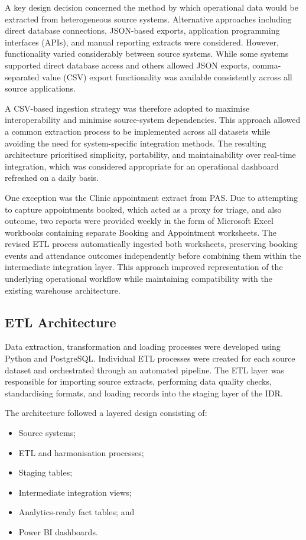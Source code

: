 A key design decision concerned the method by which operational data would be extracted from heterogeneous source systems. Alternative approaches including direct database connections, JSON-based exports, application programming interfaces (APIs), and manual reporting extracts were considered. However, functionality varied considerably between source systems. While some systems supported direct database access and others allowed JSON exports, comma-separated value (CSV) export functionality was available consistently across all source applications.

A CSV-based ingestion strategy was therefore adopted to maximise interoperability and minimise source-system dependencies. This approach allowed a common extraction process to be implemented across all datasets while avoiding the need for system-specific integration methods. The resulting architecture prioritised simplicity, portability, and maintainability over real-time integration, which was considered appropriate for an operational dashboard refreshed on a daily basis.

One exception was the Clinic appointment extract from PAS. Due to attempting to capture appointments booked, which acted as a proxy for triage, and also outcome, two reports were provided weekly in the form of Microsoft Excel workbooks containing separate Booking and Appointment worksheets. The revised ETL process automatically ingested both worksheets, preserving booking events and attendance outcomes independently before combining them within the intermediate integration layer. This approach improved representation of the underlying operational workflow while maintaining compatibility with the existing warehouse architecture.

\subsection{ETL Architecture}

Data extraction, transformation and loading processes were developed using Python and PostgreSQL. Individual ETL processes were created for each source dataset and orchestrated through an automated pipeline. The ETL layer was responsible for importing source extracts, performing data quality checks, standardising formats, and loading records into the staging layer of the IDR.

The architecture followed a layered design consisting of: 

\begin{itemize}
    \item Source systems;
    \item ETL and harmonisation processes;
    \item Staging tables;
    \item Intermediate integration views;
    \item Analytics-ready fact tables; and
    \item Power BI dashboards.
\end{itemize}

